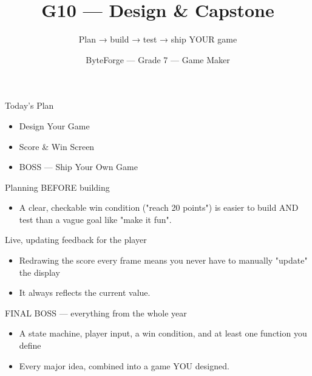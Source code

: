 \documentclass[aspectratio=169]{beamer}
\title{G10 — Design \& Capstone}
\subtitle{Plan → build → test → ship YOUR game}
\author{ByteForge --- Grade 7 --- Game Maker}
\date{}
\begin{document}
\begin{frame}
    \titlepage
\end{frame}

\begin{frame}{Today's Plan}
    \begin{itemize}
        \item Design Your Game
        \item Score \& Win Screen
        \item[$\bigstar$] BOSS --- Ship Your Own Game
    \end{itemize}
\end{frame}

\begin{frame}{Planning BEFORE building}
    \large
    \begin{itemize}
        \item A clear, checkable win condition ("reach 20 points") is easier to build AND test than a vague goal like "make it fun".
    \end{itemize}
\end{frame}


\begin{frame}{Live, updating feedback for the player}
    \large
    \begin{itemize}
        \item Redrawing the score every frame means you never have to manually "update" the display
        \item It always reflects the current value.
    \end{itemize}
\end{frame}


\begin{frame}{FINAL BOSS — everything from the whole year}
    \large
    \begin{itemize}
        \item A state machine, player input, a win condition, and at least one function you define
        \item Every major idea, combined into a game YOU designed.
    \end{itemize}

    \begin{center}
    \end{center}
\end{frame}
\end{document}
